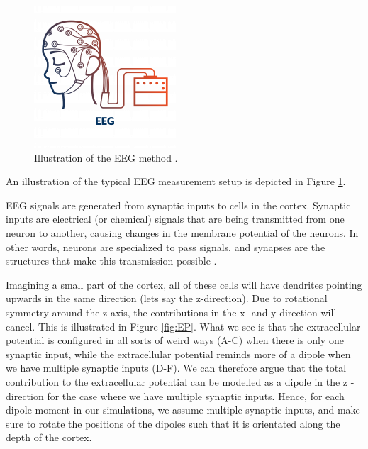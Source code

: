 \documentclass[a4paper, UKenglish, 11pt]{uiomaster}
\begin{document}
\begin{figure}[H]
    \centering
    \includegraphics[width=\linewidth]{figures/EEG.png}
    \caption{Illustration of the EEG method \cite{97}.}
    \label{fig:EEG}
\end{figure}

An illustration of the typical EEG measurement setup is depicted in Figure \ref{fig:EEG}.

EEG signals are generated from synaptic inputs to cells in the cortex. Synaptic inputs are electrical (or chemical) signals that are being transmitted from one neuron to another, causing changes in the membrane potential of the neurons. In other words, neurons are specialized to pass signals, and synapses are the structures that make this transmission possible \cite{105}.

Imagining a small part of the cortex, all of these cells will have dendrites pointing upwards in the same direction (lets say the z-direction). Due to rotational symmetry around the z-axis, the contributions in the x- and y-direction will cancel. This is illustrated in Figure \ref{fig:EP}. What we see is that the extracellular potential is configured in all sorts of weird ways (A-C) when there is only one synaptic input, while the extracellular potential reminds more of a dipole when we have multiple synaptic inputs (D-F). We can therefore argue that the total contribution to the extracellular potential can be modelled as a dipole in the z -direction for the case where we have multiple synaptic inputs. Hence, for each dipole moment in our simulations, we assume multiple synaptic inputs, and make sure to rotate the positions of the dipoles such that it is orientated along the depth of the cortex.
\end{document}

